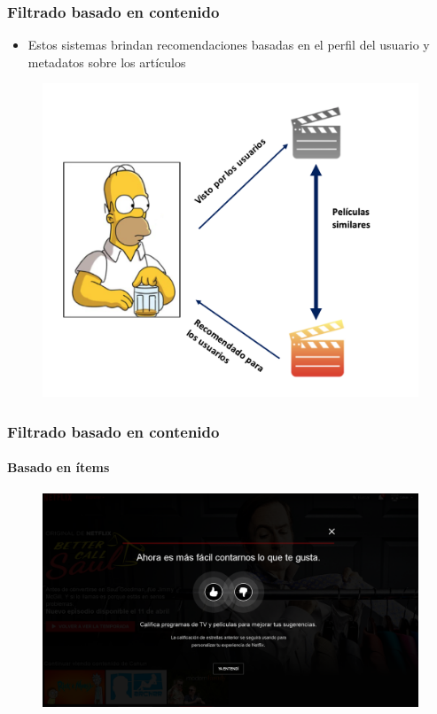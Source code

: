 \documentclass[
  shownotes,
  xcolor={svgnames},
  hyperref={colorlinks,citecolor=DarkBlue,linkcolor=Black,urlcolor=DarkBlue}
  , aspectratio=169]{beamer}
\begin{document}
\begin{frame}
\frametitle{Filtrado basado en contenido}

   
\begin{itemize}
 \item Estos sistemas brindan recomendaciones basadas en el perfil del usuario y  metadatos  sobre los artículos
 \end{itemize} 
 

    \begin{figure}[H]
\centering

  \includegraphics[scale=0.4]{../figs/Homero_movies.png}
\end{figure}

\end{frame}    
\begin{frame}
\frametitle{Filtrado basado en contenido}
\framesubtitle{Basado en ítems}

\begin{figure}[H]
\centering

  \includegraphics[scale=0.2]{../figs/netflix.png}
\end{figure}



\end{frame} 
\end{document}

